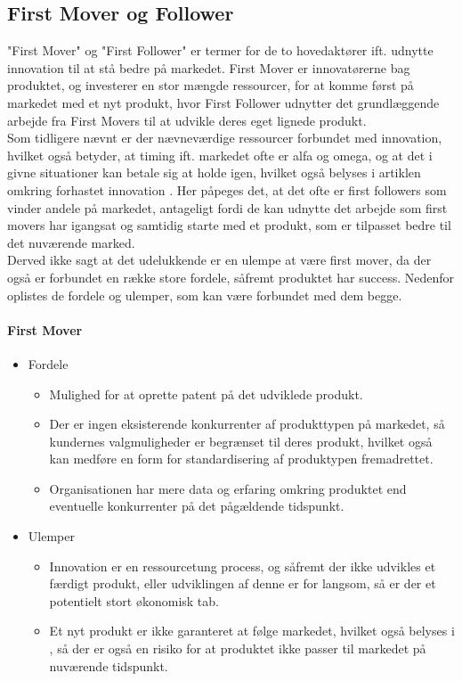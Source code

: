 \subsection{First Mover og Follower}
"First Mover" og "First Follower" er termer for de to hovedaktører ift. udnytte innovation til at stå bedre på markedet.
First Mover er innovatørerne bag produktet, og investerer en stor mængde ressourcer, for at komme først på markedet med et nyt produkt, hvor First Follower udnytter det grundlæggende arbejde fra First Movers til at udvikle deres eget lignede produkt.
\\Som tidligere nævnt er der nævneværdige ressourcer forbundet med innovation, hvilket
også betyder, at timing ift. markedet ofte er alfa og omega, og at det i givne situationer kan betale sig at holde igen, hvilket også belyses i artiklen omkring forhastet innovation \cite[a.1]{eksamensopgave}.
Her påpeges det, at det ofte er first followers som vinder andele på markedet, antageligt fordi de kan udnytte det arbejde som first movers har igangsat og samtidig starte med et produkt, som er tilpasset bedre til det nuværende marked.\\
Derved ikke sagt at det udelukkende er en ulempe at være first mover, da der også er forbundet en række store fordele, såfremt produktet har success. Nedenfor oplistes de fordele og ulemper, som kan være forbundet med dem begge.
\paragraph{First Mover}
\begin{itemize}
    \item Fordele
    \begin{itemize}
        \item Mulighed for at oprette patent på det udviklede produkt.
        \item Der er ingen eksisterende konkurrenter af produkttypen på markedet, så kundernes valgmuligheder er begrænset til deres produkt, hvilket også kan medføre en form for standardisering af produktypen fremadrettet.
        \item Organisationen har mere data og erfaring omkring produktet end eventuelle konkurrenter på det pågældende tidspunkt.
    \end{itemize}
    \item Ulemper
    \begin{itemize}
        \item Innovation er en ressourcetung process, og såfremt der ikke udvikles et færdigt produkt, eller udviklingen af denne er for langsom, så er der et potentielt stort økonomisk tab.
        \item Et nyt produkt er ikke garanteret at følge markedet, hvilket også belyses i \cite[a.1]{eksamensopgave}, så der er også en risiko for at produktet ikke passer til markedet på nuværende tidspunkt.
    \end{itemize}
\end{itemize}
